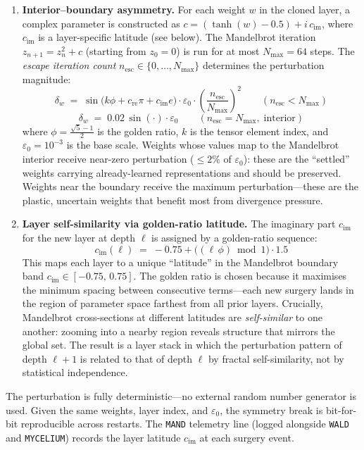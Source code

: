 \documentclass[journal,10pt,twocolumn]{IEEEtran}
\begin{document}
\begin{enumerate}
  \item \textbf{Interior--boundary asymmetry.} For each weight $w$ in the
  cloned layer, a complex parameter is constructed as
  $c = (\tanh(w) - 0.5) + i\,c_\text{im}$,
  where $c_\text{im}$ is a layer-specific latitude (see below). The Mandelbrot
  iteration $z_{n+1} = z_n^2 + c$ (starting from $z_0 = 0$) is run for at
  most $N_\text{max} = 64$ steps. The \emph{escape iteration count}
  $n_\text{esc} \in \{0,\ldots,N_\text{max}\}$ determines the perturbation
  magnitude:
  \[
    \delta_w \;=\; \sin\!\bigl(k\phi + c_\text{re}\pi + c_\text{im}e\bigr)
                   \cdot \varepsilon_0 \cdot \left(\frac{n_\text{esc}}{N_\text{max}}\right)^{\!2}
    \qquad (n_\text{esc} < N_\text{max})
  \]
  \[
    \delta_w \;=\; 0.02\,\sin(\cdot) \cdot \varepsilon_0 \qquad (n_\text{esc} = N_\text{max},\;\text{interior})
  \]
  where $\phi = \frac{\sqrt{5}-1}{2}$ is the golden ratio, $k$ is the tensor
  element index, and $\varepsilon_0 = 10^{-3}$ is the base scale. Weights
  whose values map to the Mandelbrot interior receive near-zero perturbation
  ($\leq 2\%$ of $\varepsilon_0$): these are the ``settled'' weights carrying
  already-learned representations and should be preserved. Weights near the
  boundary receive the maximum perturbation---these are the plastic, uncertain
  weights that benefit most from divergence pressure.

  \item \textbf{Layer self-similarity via golden-ratio latitude.} The
  imaginary part $c_\text{im}$ for the new layer at depth $\ell$ is assigned
  by a golden-ratio sequence:
  \[
    c_\text{im}(\ell) \;=\; -0.75 + \bigl((\ell\,\phi) \bmod 1\bigr)\cdot 1.5
  \]
  This maps each layer to a unique ``latitude'' in the Mandelbrot boundary
  band $c_\text{im} \in [-0.75,\, 0.75]$. The golden ratio is chosen because
  it maximises the minimum spacing between consecutive terms---each new surgery
  lands in the region of parameter space farthest from all prior layers.
  Crucially, Mandelbrot cross-sections at different latitudes are
  \emph{self-similar} to one another: zooming into a nearby region reveals
  structure that mirrors the global set. The result is a layer stack in which
  the perturbation pattern of depth $\ell+1$ is related to that of depth
  $\ell$ by fractal self-similarity, not by statistical independence.
\end{enumerate}

The perturbation is fully deterministic---no external random number generator
is used. Given the same weights, layer index, and $\varepsilon_0$, the
symmetry break is bit-for-bit reproducible across restarts. The
\texttt{MAND} telemetry line (logged alongside \texttt{WALD} and
\texttt{MYCELIUM}) records the layer latitude $c_\text{im}$ at each surgery
event.
\end{document}
